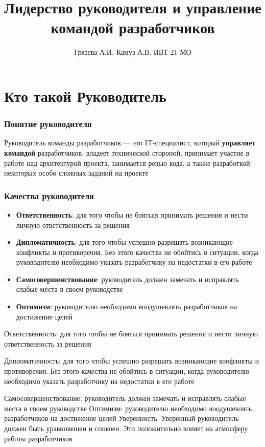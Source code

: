 \documentclass{../industrial-development}
\title{Лидерство руководителя и управление командой разработчиков}
\author{Грязева А.И. Камуз А.В. ИВТ-21 МО}
\date{}
\begin{document}
\begin{frame}
  \titlepage
\end{frame}

\section{Кто такой Руководитель}


\begin{frame} \frametitle{Понятие руководителя}

\begin{block}{}
Руководитель команды разработчиков --- это IT-специалист, который \textbf{управляет командой} разработчиков, владеет технической стороной, принимает участие в работе над архитектурой проекта, занимается ревью кода, а также разработкой некоторых особо сложных заданий на проекте
\end{block}

\end{frame}



\begin{frame} \frametitle{Качества руководителя}

  \begin{itemize}
  \item \textbf{Ответственность}: для того чтобы не бояться принимать решения и нести личную ответственность за решения 
  \item \textbf{Дипломатичность}: для того чтобы успешно разрешать возникающие конфликты и противоречия. Без этого качества не обойтись в ситуации, когда руководителю необходимо указать разработчику на недостатки в его работе
  \item \textbf{Самосовершенствование}: руководитель должен замечать и исправлять слабые места в своем руководстве
  \item \textbf{Оптимизм}: руководителю необходимо воодушевлять разработчиков на достижение целей
    \end{itemize}
  \end{frame}
\lecturenotes
Ответственность: для того чтобы не бояться принимать решения и нести личную ответственность за решения
 
Дипломатичность: для того чтобы успешно разрешать возникающие конфликты и противоречия. Без этого качества не обойтись в ситуации, когда руководителю необходимо указать разработчику на недостатки в его работе

Самосовершенствование: руководитель должен замечать и исправлять слабые места в своем руководстве
Оптимизм: руководителю необходимо воодушевлять разработчиков на достижение целей
Уверенность: Уверенный руководитель должен быть уравновешен и спокоен. Это положительно влияет на атмосферу работы разработчиков 
\end{document}
